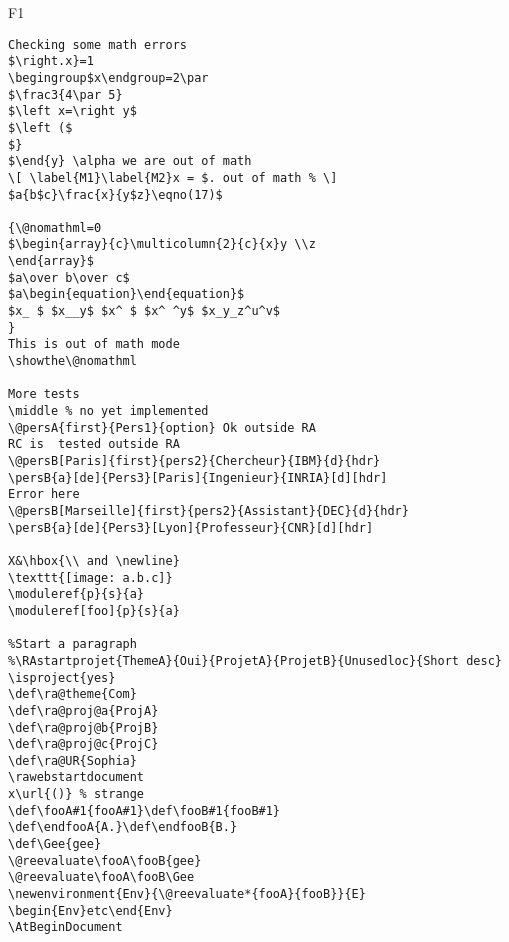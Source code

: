 \documentclass{article}
\begin{document}
\begin{filecontents+}{F1}
\begin{Verbatim}
Checking some math errors
$\right.x}=1
\begingroup$x\endgroup=2\par 
$\frac3{4\par 5}
$\left x=\right y$ 
$\left ($ 
$}
$\end{y} \alpha we are out of math
\[ \label{M1}\label{M2}x = $. out of math % \]
$a{b$c}\frac{x}{y$z}\eqno(17)$ 

{\@nomathml=0
$\begin{array}{c}\multicolumn{2}{c}{x}y \\z
\end{array}$
$a\over b\over c$
$a\begin{equation}\end{equation}$
$x_ $ $x__y$ $x^ $ $x^ ^y$ $x_y_z^u^v$
}
This is out of math mode
\showthe\@nomathml

More tests 
\middle % no yet implemented
\@persA{first}{Pers1}{option} Ok outside RA
RC is  tested outside RA
\@persB[Paris]{first}{pers2}{Chercheur}{IBM}{d}{hdr}
\persB{a}[de]{Pers3}[Paris]{Ingenieur}{INRIA}[d][hdr]
Error here
\@persB[Marseille]{first}{pers2}{Assistant}{DEC}{d}{hdr}
\persB{a}[de]{Pers3}[Lyon]{Professeur}{CNR}[d][hdr]

X&\hbox{\\ and \newline}
\texttt{[image: a.b.c]}
\moduleref{p}{s}{a}
\moduleref[foo]{p}{s}{a}

%Start a paragraph
%\RAstartprojet{ThemeA}{Oui}{ProjetA}{ProjetB}{Unusedloc}{Short desc}
\isproject{yes}
\def\ra@theme{Com}
\def\ra@proj@a{ProjA}
\def\ra@proj@b{ProjB}
\def\ra@proj@c{ProjC}
\def\ra@UR{Sophia}
\rawebstartdocument
x\url{()} % strange
\def\fooA#1{fooA#1}\def\fooB#1{fooB#1}
\def\endfooA{A.}\def\endfooB{B.}
\def\Gee{gee}
\@reevaluate\fooA\fooB{gee}
\@reevaluate\fooA\fooB\Gee
\newenvironment{Env}{\@reevaluate*{fooA}{fooB}}{E}
\begin{Env}etc\end{Env}
\AtBeginDocument




\end{Verbatim}
\end{filecontents+}
\end{document}
